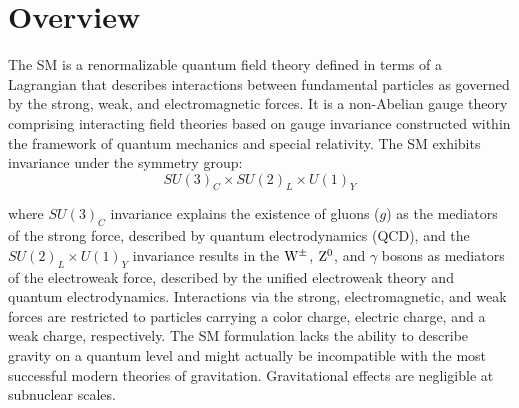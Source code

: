 \section{Overview}
\label{sec:sm_overview}

The SM is a renormalizable quantum field theory defined in terms of a Lagrangian that describes interactions between fundamental particles as governed by the strong, weak, and electromagnetic forces.
It is a non-Abelian gauge theory comprising interacting field theories based on gauge invariance constructed within the framework of quantum mechanics and special relativity.
The SM exhibits invariance under the symmetry group:
\begin{equation}
    SU(3)_C \times SU(2)_L \times U(1)_Y
\end{equation}

where $SU(3)_C$ invariance explains the existence of gluons ($g$) as the mediators of the strong force, described by quantum electrodynamics (QCD), and the $SU(2)_L \times U(1)_Y$ invariance results in the $\mathrm{W}^\pm$, $\mathrm{Z}^0$, and $\gamma$ bosons as mediators of the electroweak force, described by the unified electroweak theory and quantum electrodynamics.
Interactions via the strong, electromagnetic, and weak forces are restricted to particles carrying a color charge, electric charge, and a weak charge, respectively.
The SM formulation lacks the ability to describe gravity on a quantum level and might actually be incompatible with the most successful modern theories of gravitation.
Gravitational effects are negligible at subnuclear scales.




